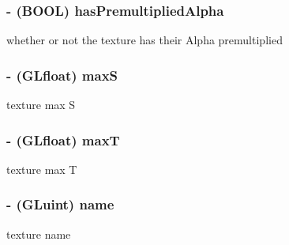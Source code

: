 \hypertarget{class_c_c_texture2_d_a5fde1910a75b87939fe6d4632c6de2ce}{
\subsubsection[{has\-Premultiplied\-Alpha}]{\setlength{\rightskip}{0pt plus 5cm}-\/ (B\-O\-O\-L) {\bf has\-Premultiplied\-Alpha}}}\label{class_c_c_texture2_d_a5fde1910a75b87939fe6d4632c6de2ce}
whether or not the texture has their Alpha premultiplied \hypertarget{class_c_c_texture2_d_a836fc67ca10abb68e21768095c534035}{
\subsubsection[{max\-S}]{\setlength{\rightskip}{0pt plus 5cm}-\/ (G\-Lfloat) {\bf max\-S}}}\label{class_c_c_texture2_d_a836fc67ca10abb68e21768095c534035}
texture max S \hypertarget{class_c_c_texture2_d_a4eb0911f8970213068825220db9e1866}{
\subsubsection[{max\-T}]{\setlength{\rightskip}{0pt plus 5cm}-\/ (G\-Lfloat) {\bf max\-T}}}\label{class_c_c_texture2_d_a4eb0911f8970213068825220db9e1866}
texture max T \hypertarget{class_c_c_texture2_d_acff887dadb97c08201b2b8fca4412898}{
\subsubsection[{name}]{\setlength{\rightskip}{0pt plus 5cm}-\/ (G\-Luint) {\bf name}}}\label{class_c_c_texture2_d_acff887dadb97c08201b2b8fca4412898}
texture name 

